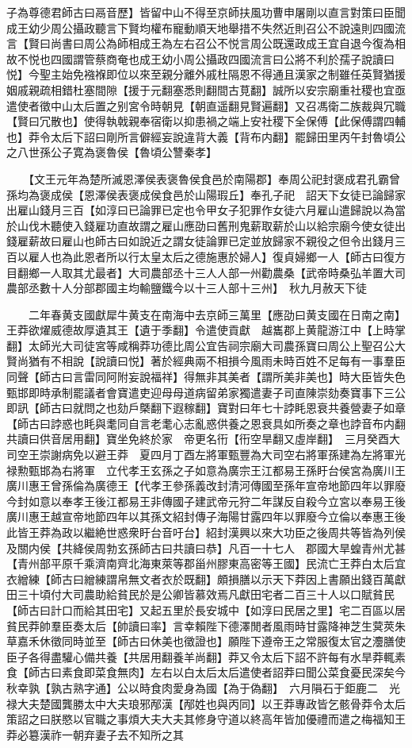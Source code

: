 子為尊德君師古曰鬲音歷】皆留中山不得至京師扶風功曹申屠剛以直言對策曰臣聞成王幼少周公攝政聽言下賢均權布寵動順天地舉措不失然近則召公不說遠則四國流言【賢曰尚書曰周公為師相成王為左右召公不悦言周公既還政成王宜自退今復為相故不悦也四國謂管蔡商奄也成王幼小周公攝政四國流言曰公將不利於孺子說讀曰悦】今聖主始免襁褓即位以來至親分離外戚杜隔恩不得通且漢家之制雖任英賢猶援姻戚親疏相錯杜塞間隙【援于元翻塞悉則翻間古莧翻】誠所以安宗廟重社稷也宜亟遣使者徵中山太后置之别宮令時朝見【朝直遥翻見賢遍翻】又召馮衛二族裁與冗職【賢曰冗散也】使得執戟親奉宿衛以抑患禍之端上安社稷下全保傅【此保傅謂四輔也】莽令太后下詔曰剛所言僻經妄說違背大義【背布内翻】罷歸田里丙午封魯頃公之八世孫公子寛為褒魯侯【魯頃公讐秦孝】

　　【文王元年為楚所滅恩澤侯表褒魯侯食邑於南陽郡】奉周公祀封褒成君孔霸曾孫均為褒成侯【恩澤侯表褒成侯食邑於山陽瑕丘】奉孔子祀　詔天下女徒已論歸家出雇山錢月三百【如淳曰已論罪已定也令甲女子犯罪作女徒六月雇山遣歸說以為當於山伐木聽使入錢雇功直故謂之雇山應劭曰舊刑鬼薪取薪於山以給宗廟今使女徒出錢雇薪故曰雇山也師古曰如說近之謂女徒論罪已定並放歸家不親役之但令出錢月三百以雇人也為此恩者所以行太皇太后之德施惠於婦人】復貞婦鄉一人【師古曰復方目翻鄉一人取其尤最者】大司農部丞十三人人部一州勸農桑【武帝時桑弘羊置大司農部丞數十人分部郡國主均輸鹽鐵今以十三人部十三州】　秋九月赦天下徒

　　二年春黄支國獻犀牛黄支在南海中去京師三萬里【應劭曰黄支國在日南之南】王莽欲燿威德故厚遺其王【遺于季翻】令遣使貢獻　越巂郡上黄龍游江中【上時掌翻】太師光大司徒宮等咸稱莽功德比周公宜告祠宗廟大司農孫寶曰周公上聖召公大賢尚猶有不相說【說讀曰悦】著於經典兩不相損今風雨未時百姓不足每有一事羣臣同聲【師古曰言雷同阿附妄說福祥】得無非其美者【謂所美非美也】時大臣皆失色甄邯即時承制罷議者會寶遣吏迎母母道病留弟家獨遣妻子司直陳崇劾奏寶事下三公即訊【師古曰就問之也劾戶槩翻下遐稼翻】寶對曰年七十誖眊恩衰共養營妻子如章【師古曰誖惑也眊與耄同自言老耄心志亂惑供養之恩衰具如所奏之章也誖音布内翻共讀曰供音居用翻】寶坐免終於家　帝更名衎【衎空旱翻又虛岸翻】　三月癸酉大司空王崇謝病免以避王莽　夏四月丁酉左將軍甄豐為大司空右將軍孫建為左將軍光禄勲甄邯為右將軍　立代孝王玄孫之子如意為廣宗王江都易王孫盱台侯宮為廣川王廣川惠王曾孫倫為廣德王【代孝王參孫義改封清河傳國至孫年宣帝地節四年以罪廢今封如意以奉孝王後江都易王非傳國子建武帝元狩二年謀反自殺今立宮以奉易王後廣川惠王越宣帝地節四年以其孫文紹封傳子海陽甘露四年以罪廢今立倫以奉惠王後此皆王莽為政以繼絶世惑衆盱台音吁台】紹封漢興以來大功臣之後周共等皆為列侯及關内侯【共絳侯周勃玄孫師古曰共讀曰恭】凡百一十七人　郡國大旱蝗青州尤甚【青州部平原千乘濟南齊北海東萊等郡甾州膠東高密等王國】民流亡王莽白太后宜衣繒練【師古曰繒練謂帛無文者衣於既翻】頗損膳以示天下莽因上書願出錢百萬獻田三十頃付大司農助給貧民於是公卿皆慕效焉凡獻田宅者二百三十人以口賦貧民【師古曰計口而給其田宅】又起五里於長安城中【如淳曰民居之里】宅二百區以居貧民莽帥羣臣奏太后【帥讀曰率】言幸賴陛下德澤閒者風雨時甘露降神芝生蓂莢朱草嘉禾休徵同時並至【師古曰休美也徵證也】願陛下遵帝王之常服復太官之灋膳使臣子各得盡驩心備共養【共居用翻養羊尚翻】莽又令太后下詔不許每有水旱莽輒素食【師古曰素食即菜食無肉】左右以白太后太后遣使者詔莽曰聞公菜食憂民深矣今秋幸孰【孰古熟字通】公以時食肉愛身為國【為于偽翻】　六月隕石于鉅鹿二　光禄大夫楚國龔勝太中大夫琅邪邴漢【邴姓也與丙同】以王莽專政皆乞骸骨莽令太后策詔之曰朕愍以官職之事煩大夫大夫其修身守道以終高年皆加優禮而遣之梅福知王莽必簒漢祚一朝弃妻子去不知所之其

